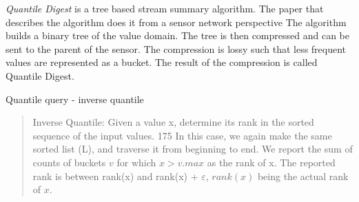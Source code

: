 \emph{Quantile Digest} is a tree based stream summary algorithm. The paper that describes the algorithm does it from a sensor network perspective 
The algorithm builds a binary tree of the value domain. The tree is then compressed and can be sent to the parent of the sensor. The compression is lossy such that less frequent values are represented as a bucket. The result of the compression is called Quantile Digest.

Quantile query - inverse quantile

\blockquote{

Inverse Quantile: Given a value x, determine its
rank in the sorted sequence of the input values.
175
In this case, we again make the same sorted list (L),
and traverse it from beginning to end. We report the
sum of counts of buckets $v$ for which $x > v.max$ as
the rank of x. The reported rank is between rank(x)
and rank(x) + $\varepsilon$, $rank(x)$ being the actual rank of
$x$.}
